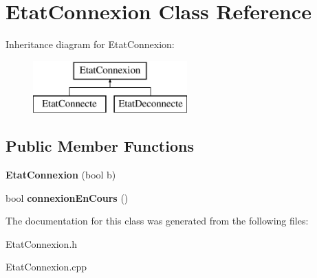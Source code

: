 \section{Etat\-Connexion Class Reference}
\label{class_etat_connexion}
Inheritance diagram for Etat\-Connexion\-:\begin{figure}[H]
\begin{center}
\leavevmode
\includegraphics[height=2.000000cm]{class_etat_connexion}
\end{center}
\end{figure}
\subsection*{Public Member Functions}
\begin{DoxyCompactItemize}
\item 
{\bfseries Etat\-Connexion} (bool b)\label{class_etat_connexion_ab2f7cac2d3fb8ca6b89a6e9ae65262b5}

\item 
bool {\bfseries connexion\-En\-Cours} ()\label{class_etat_connexion_acbb22c19f9b8fb864cd783c51f725c6e}

\end{DoxyCompactItemize}


The documentation for this class was generated from the following files\-:\begin{DoxyCompactItemize}
\item 
Etat\-Connexion.\-h\item 
Etat\-Connexion.\-cpp\end{DoxyCompactItemize}
